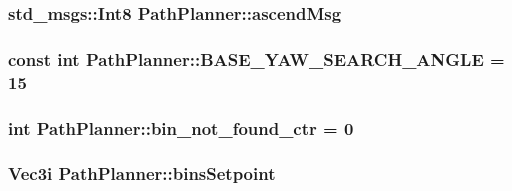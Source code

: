 \subsubsection[{\texorpdfstring{ascend\+Msg}{ascendMsg}}]{\setlength{\rightskip}{0pt plus 5cm}std\+\_\+msgs\+::\+Int8 Path\+Planner\+::ascend\+Msg}\hypertarget{classPathPlanner_a5abd76dde4ea570d1f558336ac13f3e4}{}\label{classPathPlanner_a5abd76dde4ea570d1f558336ac13f3e4}
\subsubsection[{\texorpdfstring{B\+A\+S\+E\+\_\+\+Y\+A\+W\+\_\+\+S\+E\+A\+R\+C\+H\+\_\+\+A\+N\+G\+LE}{BASE_YAW_SEARCH_ANGLE}}]{\setlength{\rightskip}{0pt plus 5cm}const int Path\+Planner\+::\+B\+A\+S\+E\+\_\+\+Y\+A\+W\+\_\+\+S\+E\+A\+R\+C\+H\+\_\+\+A\+N\+G\+LE = 15}\hypertarget{classPathPlanner_a683836da96618f1a2d6e153ef74e55a8}{}\label{classPathPlanner_a683836da96618f1a2d6e153ef74e55a8}
\subsubsection[{\texorpdfstring{bin\+\_\+not\+\_\+found\+\_\+ctr}{bin_not_found_ctr}}]{\setlength{\rightskip}{0pt plus 5cm}int Path\+Planner\+::bin\+\_\+not\+\_\+found\+\_\+ctr = 0}\hypertarget{classPathPlanner_a4c5f3c04540a24807a55c4292f2f4216}{}\label{classPathPlanner_a4c5f3c04540a24807a55c4292f2f4216}
\subsubsection[{\texorpdfstring{bins\+Setpoint}{binsSetpoint}}]{\setlength{\rightskip}{0pt plus 5cm}Vec3i Path\+Planner\+::bins\+Setpoint}\hypertarget{classPathPlanner_aede3f213d16ed3f67ba27380de436fa7}{}\label{classPathPlanner_aede3f213d16ed3f67ba27380de436fa7}
